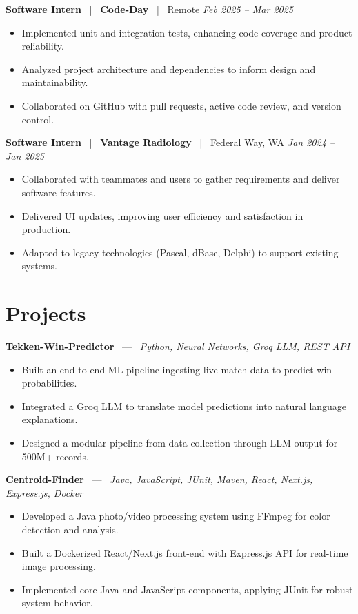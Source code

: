 \documentclass[10pt, letterpaper]{article}
\newcommand{\jobhead}[4]{%
  \vspace{5pt}%
  {\bfseries\color{dark}#1}%
  ~{\color{light}|}~%
  {\bfseries\color{navy}#2}%
  ~{\color{light}|}~%
  {\color{light}#3}%
  \hfill{\color{light}\small\textit{#4}}\\[-2pt]%
}
\newcommand{\projhead}[3]{%
  \vspace{5pt}%
  {\bfseries\color{dark}\href{#2}{#1}}%
  ~{\color{light}---}~%
  {\color{light}\small\textit{#3}}\\[-2pt]%
}
\begin{document}
\jobhead{Software Intern}{Code-Day}{Remote}{Feb 2025 – Mar 2025}
\begin{itemize}
  \item Implemented unit and integration tests, enhancing code coverage and product reliability.
  \item Analyzed project architecture and dependencies to inform design and maintainability.
  \item Collaborated on GitHub with pull requests, active code review, and version control.
\end{itemize}

\jobhead{Software Intern}{Vantage Radiology}{Federal Way, WA}{Jan 2024 – Jan 2025}
\begin{itemize}
  \item Collaborated with teammates and users to gather requirements and deliver software features.
  \item Delivered UI updates, improving user efficiency and satisfaction in production.
  \item Adapted to legacy technologies (Pascal, dBase, Delphi) to support existing systems.
\end{itemize}

\section{Projects}

\projhead{Tekken-Win-Predictor}{}{Python, Neural Networks, Groq LLM, REST API}
\begin{itemize}
  \item Built an end-to-end ML pipeline ingesting live match data to predict win probabilities.
  \item Integrated a Groq LLM to translate model predictions into natural language explanations.
  \item Designed a modular pipeline from data collection through LLM output for 500M+ records.
\end{itemize}

\projhead{Centroid-Finder}{https://github.com/xavierb117/centroid-finder}{Java, JavaScript, JUnit, Maven, React, Next.js, Express.js, Docker}
\begin{itemize}
  \item Developed a Java photo/video processing system using FFmpeg for color detection and analysis.
  \item Built a Dockerized React/Next.js front-end with Express.js API for real-time image processing.
  \item Implemented core Java and JavaScript components, applying JUnit for robust system behavior.
\end{itemize}
\end{document}
